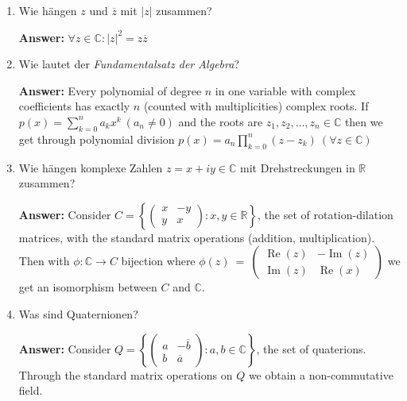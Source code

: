\documentclass[11pt]{article}
\newcommand{\abs}[1]{\left|#1\right|}
\newcommand{\sumn}[4]{\sum_{#1=#2}^{#3}{#4}}
\newcommand{\RR}[0]{\mathbb{R}}
\newcommand{\CC}[0]{\mathbb{C}}
\renewcommand{\Re}[0]{\operatorname{Re}}
\renewcommand{\Im}[0]{\operatorname{Im}}
\begin{document}
\begin{enumerate}
    \item Wie hängen $z$ und $\overline{z}$ mit $\abs{z}$ zusammen?

    \textbf{Answer:} $\forall z \in \CC\colon \abs{z}^2 = z \overline{z}$

    \item Wie lautet der \textit{Fundamentalsatz der Algebra}?

    \textbf{Answer:} Every polynomial of degree $n$ in one variable with complex coefficients has exactly $n$ (counted with multiplicities) complex roots. If $p(x) = \sumn{k}{0}{n}{a_k x^k}~(a_n \neq 0)$ and the roots are $z_1, z_2, \dots, z_n \in \CC$ then we get through polynomial division $p(x) = a_n \prod_{k=0}^n(z - z_k)~(\forall z\in \CC)$

    \item Wie hängen komplexe Zahlen $z = x + iy \in \CC$ mit Drehstreckungen in $\RR$ zusammen?

    \textbf{Answer:} Consider $C = \left\{\left(\begin{array}{cc}x&-y\\y&x\end{array}\right)\colon x,y \in \RR \right\}$, the set of rotation-dilation matrices, with the standard matrix operations (addition, multiplication). Then with $\phi\colon\CC \to C$ bijection where $\phi(z)~=~\left(\begin{array}{cc}\Re(z)&-\Im(z)\\\Im(z)&\Re(x)\end{array}\right)$ we get an isomorphism between $C$ and $\CC$.

    \item Was sind Quaternionen?

    \textbf{Answer:} Consider $Q = \left\{\left(\begin{array}{cc}a&-\overline{b}\\b&\overline{a}\end{array}\right)\colon a, b \in \CC \right\}$, the set of quaterions. Through the standard matrix operations on $Q$ we obtain a non-commutative field.


\end{enumerate}
\end{document}
